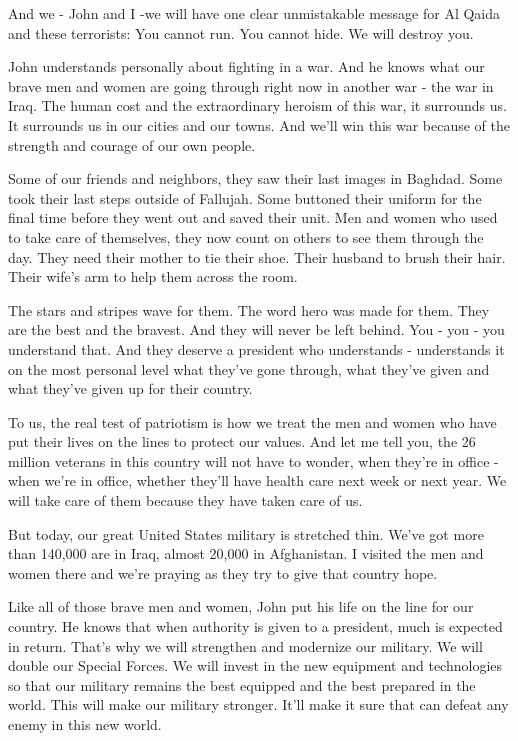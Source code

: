 And we - John and I -we will have one clear unmistakable message for Al
Qaida and these terrorists: You cannot run. You cannot hide. We will
destroy you.

John understands personally about fighting in a war. And he knows what
our brave men and women are going through right now in another war - the
war in Iraq. The human cost and the extraordinary heroism of this war,
it surrounds us. It surrounds us in our cities and our towns. And we'll
win this war because of the strength and courage of our own people.

Some of our friends and neighbors, they saw their last images in
Baghdad. Some took their last steps outside of Fallujah. Some buttoned
their uniform for the final time before they went out and saved their
unit. Men and women who used to take care of themselves, they now count
on others to see them through the day. They need their mother to tie
their shoe. Their husband to brush their hair. Their wife's arm to help
them across the room.

The stars and stripes wave for them. The word hero was made for them.
They are the best and the bravest. And they will never be left behind.
You - you - you understand that. And they deserve a president who
understands - understands it on the most personal level what they've
gone through, what they've given and what they've given up for their
country.

To us, the real test of patriotism is how we treat the men and women who
have put their lives on the lines to protect our values. And let me tell
you, the 26 million veterans in this country will not have to wonder,
when they're in office - when we're in office, whether they'll have
health care next week or next year. We will take care of them because
they have taken care of us.

But today, our great United States military is stretched thin. We've got
more than 140,000 are in Iraq, almost 20,000 in Afghanistan. I visited
the men and women there and we're praying as they try to give that
country hope.

Like all of those brave men and women, John put his life on the line for
our country. He knows that when authority is given to a president, much
is expected in return. That's why we will strengthen and modernize our
military. We will double our Special Forces. We will invest in the new
equipment and technologies so that our military remains the best
equipped and the best prepared in the world. This will make our military
stronger. It'll make it sure that can defeat any enemy in this new
world.


